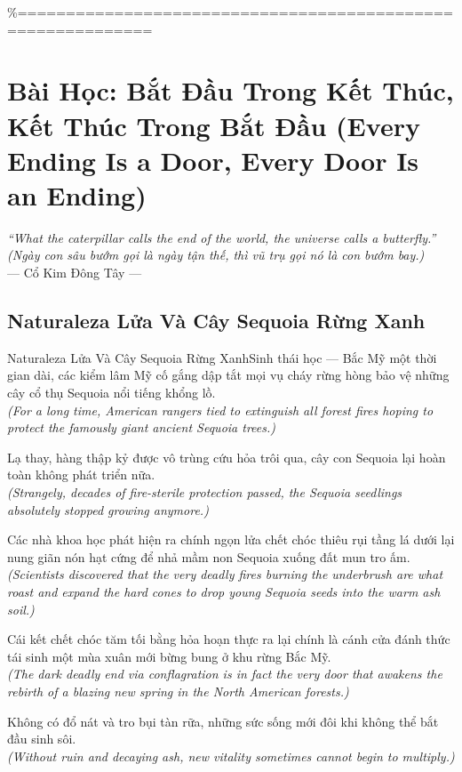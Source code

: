 \%============================================================
\chapter{Bài Học: Bắt Đầu Trong Kết Thúc, Kết Thúc Trong Bắt Đầu (Every Ending Is a Door, Every Door Is an Ending)}
\begin{center}
  \textit{\color{truyengold}``What the caterpillar calls the end of the world, the universe calls a butterfly.''}\\[4pt]
  \textit{(Ngày con sâu bướm gọi là ngày tận thế, thì vũ trụ gọi nó là con bướm bay.)}\\[4pt]
  \small\color{truyenblue}--- Cổ Kim Đông Tây ---
\end{center}
\ngancach

\section{Naturaleza Lửa Và Cây Sequoia Rừng Xanh}
\begin{truyen}{Naturaleza Lửa Và Cây Sequoia Rừng Xanh}{Sinh thái học --- Bắc Mỹ}
 một thời gian dài, các kiểm lâm Mỹ cố gắng dập tắt mọi vụ cháy rừng hòng bảo vệ những cây cổ thụ Sequoia nổi tiếng khổng lồ.\\[4pt]
\textit{(For a long time, American rangers tied to extinguish all forest fires hoping to protect the famously giant ancient Sequoia trees.)}

Lạ thay, hàng thập kỷ được vô trùng cứu hỏa trôi qua, cây con Sequoia lại hoàn toàn không phát triển nữa.\\[4pt]
\textit{(Strangely, decades of fire-sterile protection passed, the Sequoia seedlings absolutely stopped growing anymore.)}

Các nhà khoa học phát hiện ra chính ngọn lửa chết chóc thiêu rụi tầng lá dưới lại nung giãn nón hạt cứng để nhả mầm non Sequoia xuống đất mun tro ấm.\\[4pt]
\textit{(Scientists discovered that the very deadly fires burning the underbrush are what roast and expand the hard cones to drop young Sequoia seeds into the warm ash soil.)}

Cái kết chết chóc tăm tối bằng hỏa hoạn thực ra lại chính là cánh cửa đánh thức tái sinh một mùa xuân mới bừng bung ở khu rừng Bắc Mỹ.\\[4pt]
\textit{(The dark deadly end via conflagration is in fact the very door that awakens the rebirth of a blazing new spring in the North American forests.)}

\end{truyen}
\begin{baihoc}
  Không có đổ nát và tro bụi tàn rữa, những sức sống mới đôi khi không thể bắt đầu sinh sôi.\\[4pt]
  \textit{(Without ruin and decaying ash, new vitality sometimes cannot begin to multiply.)}
\end{baihoc}

